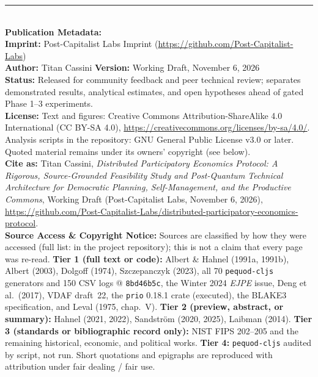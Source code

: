 \documentclass[10pt,twoside,openany]{book}
\theoremstyle{dpepstyle}
\begin{document}
\thispagestyle{empty}
\null\vfill
\noindent\rule{\textwidth}{0.4pt}\\[0.4em]
{\footnotesize\color{SlateDark}
\textbf{Publication Metadata:}\\
\textbf{Imprint:} Post-Capitalist Labs Imprint (\url{https://github.com/Post-Capitalist-Labs})\\
\textbf{Author:} Titan Cassini \quad \textbf{Version:} Working Draft, November 6, 2026\\
\textbf{Status:} Released for community feedback and peer technical review; separates demonstrated results, analytical estimates, and open hypotheses ahead of gated Phase 1--3 experiments.\\
\textbf{License:} Text and figures: Creative Commons Attribution-ShareAlike 4.0 International (CC BY-SA 4.0), \url{https://creativecommons.org/licenses/by-sa/4.0/}. Analysis scripts in the repository: GNU General Public License v3.0 or later. Quoted material remains under its owners' copyright (see below).\\
\textbf{Cite as:} Titan Cassini, \emph{Distributed Participatory Economics Protocol: A Rigorous, Source-Grounded Feasibility Study and Post-Quantum Technical Architecture for Democratic Planning, Self-Management, and the Productive Commons}, Working Draft (Post-Capitalist Labs, November 6, 2026), \url{https://github.com/Post-Capitalist-Labs/distributed-participatory-economics-protocol}.\\[0.35em]
\textbf{Source Access \& Copyright Notice:} Sources are classified by how they were accessed (full list:  in the project repository); this is not a claim that every page was re-read. \textbf{Tier 1 (full text or code):} Albert \& Hahnel (1991a, 1991b), Albert (2003), Dolgoff (1974), Szczepanczyk (2023), all 70 \texttt{pequod-cljs} generators and 150 CSV logs @ \texttt{8bd46b5c}, the Winter 2024 \emph{EJPE} issue, Deng et al.\ (2017), VDAF draft~22, the \texttt{prio} 0.18.1 crate (executed), the BLAKE3 specification, and Leval (1975, chap.~V). \textbf{Tier 2 (preview, abstract, or summary):} Hahnel (2021, 2022), Sandstr\"om (2020, 2025), Laibman (2014). \textbf{Tier 3 (standards or bibliographic record only):} NIST FIPS 202--205 and the remaining historical, economic, and political works. \textbf{Tier 4:} \texttt{pequod-cljs} audited by script, not run. Short quotations and epigraphs are reproduced with attribution under fair dealing / fair use.}
\clearpage
\end{document}

